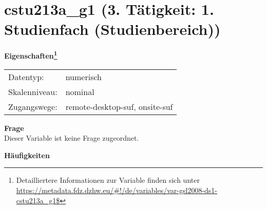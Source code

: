 
    \setcounter{footnote}{0}

    \vspace*{-1.8cm}
	\section{cstu213a\_g1 (3. Tätigkeit: 1. Studienfach (Studienbereich))}
	\label{section:cstu213a_g1}



    \vspace*{0.5cm}
    \noindent\textbf{Eigenschaften\footnote{Detailliertere Informationen zur Variable finden sich unter
		\url{https://metadata.fdz.dzhw.eu/\#!/de/variables/var-gsl2008-ds1-cstu213a_g1$}}}\\
	\begin{tabularx}{\hsize}{@{}lX}
	Datentyp: & numerisch \\
	Skalenniveau: & nominal \\
	Zugangswege: &
	  remote-desktop-suf, 
	  onsite-suf
 \\
    \end{tabularx}



		\vspace*{0.5cm}
		\noindent\textbf{Frage}\\
		Dieser Variable ist keine Frage zugeordnet.





        		\vspace*{0.5cm}
                \noindent\textbf{Häufigkeiten}

